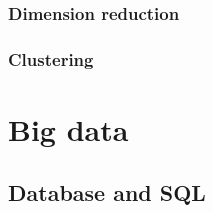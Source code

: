\documentclass[
]{book}
\begin{document}
\hypertarget{dimension-reduction}{%
\subsection{Dimension reduction}\label{dimension-reduction}}

\hypertarget{clustering}{%
\subsection{Clustering}\label{clustering}}

\hypertarget{big_data}{%
\chapter{Big data}\label{big_data}}

\hypertarget{database-and-sql}{%
\section{Database and SQL}\label{database-and-sql}}

  
\end{document}
